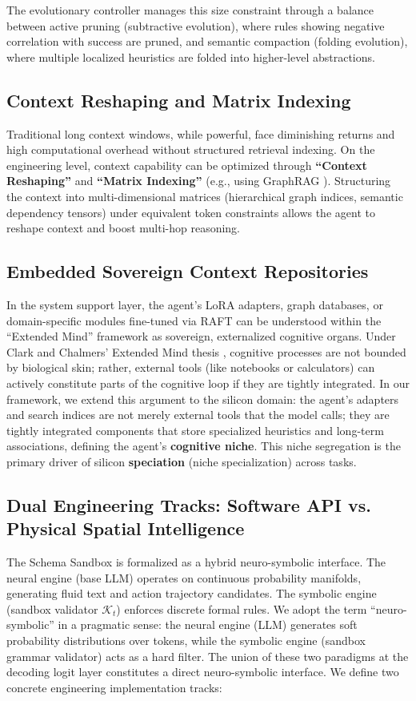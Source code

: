 \documentclass[10pt,journal,compsoc]{IEEEtran}
\begin{document}
The evolutionary controller manages this size constraint through a balance between active pruning (subtractive evolution), where rules showing negative correlation with success are pruned, and semantic compaction (folding evolution), where multiple localized heuristics are folded into higher-level abstractions.

\subsection{Context Reshaping and Matrix Indexing}
Traditional long context windows, while powerful, face diminishing returns and high computational overhead without structured retrieval indexing. On the engineering level, context capability can be optimized through \textbf{``Context Reshaping''} and \textbf{``Matrix Indexing''} (e.g., using GraphRAG \cite{edge2024}). Structuring the context into multi-dimensional matrices (hierarchical graph indices, semantic dependency tensors) under equivalent token constraints allows the agent to reshape context and boost multi-hop reasoning.

\subsection{Embedded Sovereign Context Repositories}
In the system support layer, the agent's LoRA adapters, graph databases, or domain-specific modules fine-tuned via RAFT \cite{zhang2024} can be understood within the ``Extended Mind'' framework as sovereign, externalized cognitive organs. Under Clark and Chalmers' Extended Mind thesis \cite{clark1998}, cognitive processes are not bounded by biological skin; rather, external tools (like notebooks or calculators) can actively constitute parts of the cognitive loop if they are tightly integrated. In our framework, we extend this argument to the silicon domain: the agent's adapters and search indices are not merely external tools that the model calls; they are tightly integrated components that store specialized heuristics and long-term associations, defining the agent's \textbf{cognitive niche}. This niche segregation is the primary driver of silicon \textbf{speciation} (niche specialization) across tasks.

\subsection{Dual Engineering Tracks: Software API vs. Physical Spatial Intelligence}
The Schema Sandbox is formalized as a hybrid neuro-symbolic interface. The neural engine (base LLM) operates on continuous probability manifolds, generating fluid text and action trajectory candidates. The symbolic engine (sandbox validator $\mathcal{K}_t$) enforces discrete formal rules. We adopt the term ``neuro-symbolic'' in a pragmatic sense: the neural engine (LLM) generates soft probability distributions over tokens, while the symbolic engine (sandbox grammar validator) acts as a hard filter. The union of these two paradigms at the decoding logit layer constitutes a direct neuro-symbolic interface. We define two concrete engineering implementation tracks:
\end{document}
